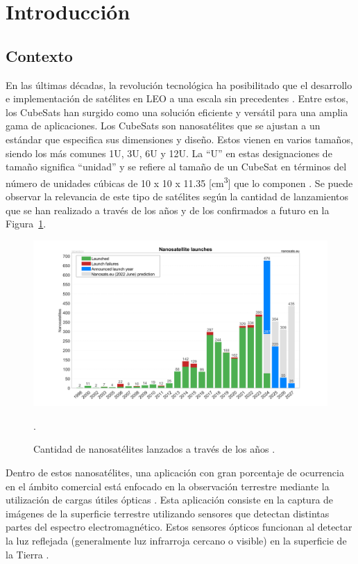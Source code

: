 \section{Introducción}

\subsection{Contexto}
En las últimas décadas, la revolución tecnológica ha posibilitado que el desarrollo e implementación de satélites en \gls{LEO} a una escala sin precedentes \cite{ref1}. Entre estos, los CubeSats han surgido como una solución eficiente y versátil para una amplia gama de aplicaciones. Los CubeSats son nanosatélites que se ajustan a un estándar que especifica sus dimensiones y diseño. Estos vienen en varios tamaños, siendo los más comunes 1U, 3U, 6U y 12U. La “U” en estas designaciones de tamaño significa “unidad” y se refiere al tamaño de un CubeSat en términos del número de unidades cúbicas de 10 x 10 x 11.35 [cm\textsuperscript{3}] que lo componen \cite{ref2}. Se puede observar la relevancia de este tipo de satélites según la cantidad de lanzamientos que se han realizado a través de los años y de los confirmados a futuro en la Figura~\ref{fig:nanosats}.

\begin{figure}[h]
	\centering    
	\includegraphics[width=1\textwidth]{Nanosats_years_2024-05-31_large.png}
	\caption{Cantidad de nanosatélites lanzados a través de los años \cite{ref1}.}.
	\label{fig:nanosats}
\end{figure}

Dentro de estos nanosatélites, una aplicación con gran porcentaje de ocurrencia en el ámbito comercial está enfocado en la observación terrestre mediante la utilización de cargas útiles ópticas \cite{ref3}. Esta aplicación consiste en la captura de imágenes de la superficie terrestre utilizando sensores que detectan distintas partes del espectro electromagnético. Estos sensores ópticos funcionan al detectar la luz reflejada (generalmente luz infrarroja cercano o visible) en la superficie de la Tierra \cite{ref4}.

